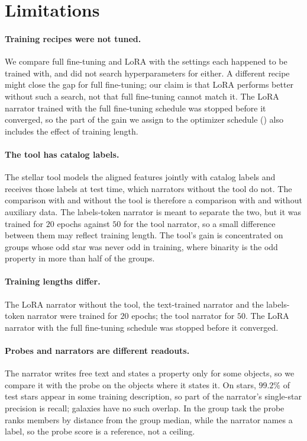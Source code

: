 \section{Limitations}\label{sec:limitations}

\paragraph{Training recipes were not tuned.} We compare full fine-tuning and LoRA with
the settings each happened to be trained with, and did not search hyperparameters for either.
A different recipe might close the gap for full fine-tuning; our claim is that LoRA performs
better without such a search, not that full fine-tuning cannot match it. The LoRA narrator
trained with the full fine-tuning schedule was stopped before it converged, so the part of
the gain we assign to the optimizer schedule () also includes the effect of
training length.

\paragraph{The tool has catalog labels.} The stellar tool models the aligned features jointly
with catalog labels and receives those labels at test time, which narrators without the tool
do not. The comparison with and without the tool is therefore a comparison with and without
auxiliary data. The labels-token narrator is meant to separate the two, but it was trained for
$20$ epochs against $50$ for the tool narrator, so a small difference between them may reflect
training length. The tool's gain is concentrated on groups whose odd star was never odd in
training, where binarity is the odd property in more than half of the groups.

\paragraph{Training lengths differ.} The LoRA narrator without the tool, the text-trained
narrator and the labels-token narrator were trained for $20$ epochs; the tool narrator for
$50$. The LoRA narrator with the full fine-tuning schedule was stopped before it converged.

\paragraph{Probes and narrators are different readouts.} The narrator writes free text and
states a property only for some objects, so we compare it with the probe on the objects where it
states it. On stars, $99.2\%$ of test stars appear in some training description, so part of the
narrator's single-star precision is recall; galaxies have no such overlap. In the group task the
probe ranks members by distance from the group median, while the narrator names a label, so the
probe score is a reference, not a ceiling.

